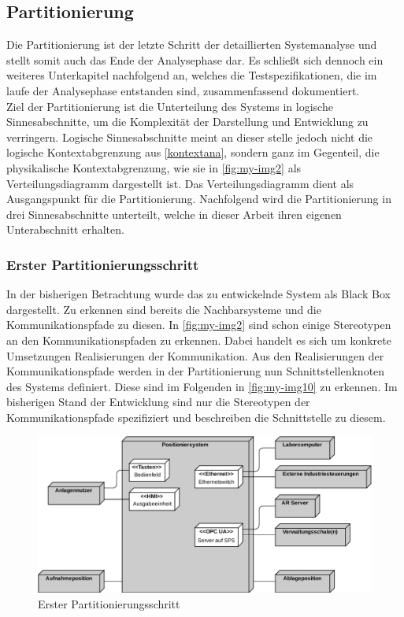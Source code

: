 \documentclass[../../../Bachelorarbeit.tex]{subfiles}
\begin{document}
\subsection{Partitionierung}
Die Partitionierung ist der letzte Schritt der detaillierten Systemanalyse und stellt somit auch das Ende der Analysephase dar. Es schließt sich dennoch ein weiteres Unterkapitel nachfolgend an, welches die Testspezifikationen, die im laufe der Analysephase entstanden sind, zusammenfassend dokumentiert. \\
Ziel der Partitionierung ist die Unterteilung des Systems in logische Sinnesabschnitte, um die Komplexität der Darstellung und Entwicklung zu verringern. Logische Sinnesabschnitte meint an dieser stelle jedoch nicht die logische Kontextabgrenzung aus \autoref{kontextana}, sondern ganz im Gegenteil, die physikalische Kontextabgrenzung, wie sie in \autoref{fig:my-img2} als Verteilungsdiagramm dargestellt ist. Das Verteilungsdiagramm dient als Ausgangspunkt für die Partitionierung. Nachfolgend wird die Partitionierung in drei Sinnesabschnitte unterteilt, welche in dieser Arbeit ihren eigenen Unterabschnitt erhalten. \\ %

\subsubsection{Erster Partitionierungsschritt}
In der bisherigen Betrachtung wurde das zu entwickelnde System als Black Box dargestellt. Zu erkennen sind bereits die Nachbarsysteme und die Kommunikationspfade zu diesen. In \autoref{fig:my-img2} sind schon einige Stereotypen an den Kommunikationspfaden zu erkennen. Dabei handelt es sich um konkrete Umsetzungen \bzw Realisierungen der Kommunikation. Aus den Realisierungen der Kommunikationspfade werden in der Partitionierung nun Schnittstellenknoten des Systems definiert. Diese sind im Folgenden in \autoref{fig:my-img10} zu erkennen. Im bisherigen Stand der Entwicklung sind nur die Stereotypen der Kommunikationspfade spezifiziert und beschreiben die Schnittstelle zu diesem. 

\begin{figure}[H]
    \centering
    \includegraphics[width=\textwidth]{Images/erster_schritt.pdf}
    \caption[Erster Partitionierungsschritt]{Erster Partitionierungsschritt}
    \label{fig:my-img10}
\end{figure}
\end{document}
